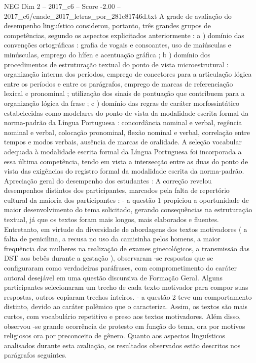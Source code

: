 \begin{textsample}{NEG Dim 2 – 2017\_c6 – Score -2.00 – 2017\_c6/enade\_2017\_letras\_por\_281c81746d.txt}
A grade de avaliação do desempenho linguístico considerou, portanto, três grandes grupos de competências, segundo os aspectos explicitados anteriormente : a ) domínio das convenções ortográficas : grafia de vogais e consoantes, uso de maiúsculas e minúsculas, emprego do hífen e acentuação gráfica ; b ) domínio dos procedimentos de estruturação textual do ponto de vista microestrutural : organização interna dos períodos, emprego de conectores para a articulação lógica entre os períodos e entre os parágrafos, emprego de marcas de referenciação lexical e pronominal ; utilização dos sinais de pontuação que contribuem para a organização lógica da frase ; c ) domínio das regras de caráter morfossintático estabelecidas como modelares do ponto de vista da modalidade escrita formal da norma-padrão da Língua Portuguesa : concordância nominal e verbal, regência nominal e verbal, colocação pronominal, flexão nominal e verbal, correlação entre tempos e modos verbais, ausência de marcas de oralidade.
A seleção vocabular adequada à modalidade escrita formal da Língua Portuguesa foi incorporada a essa última competência, tendo em vista a intersecção entre as duas do ponto de vista das exigências do registro formal da modalidade escrita da norma-padrão.
Apreciação geral do desempenho dos estudantes : A correção revelou desempenhos distintos dos participantes, marcados pela falta de repertório cultural da maioria dos participantes : - a questão 1 propiciou a oportunidade de maior desenvolvimento do tema solicitado, gerando consequências na estruturação textual, já que os textos foram mais longos, mais elaborados e fluentes.
Entretanto, em virtude da diversidade de abordagens dos textos motivadores ( a falta de penicilina, a recusa no uso da camisinha pelos homens, a maior frequência das mulheres na realização de exames ginecológicos, a transmissão das DST aos bebês durante a gestação ), observaram -se respostas que se configuraram como verdadeiras paráfrases, com comprometimento do caráter autoral desejável em uma questão discursiva de Formação Geral.
Alguns participantes selecionaram um trecho de cada texto motivador para compor suas respostas, outros copiaram trechos inteiros. - a questão 2 teve um comportamento distinto, devido ao caráter polêmico que o caracteriza.
Assim, os textos são mais curtos, com vocabulário repetitivo e preso aos textos motivadores.
Além disso, observou -se grande ocorrência de protesto em função do tema, ora por motivos religiosos ora por preconceito de gênero.
Quanto aos aspectos linguísticos analisados durante esta avaliação, os resultados observados estão descritos nos parágrafos seguintes.

\end{textsample}
